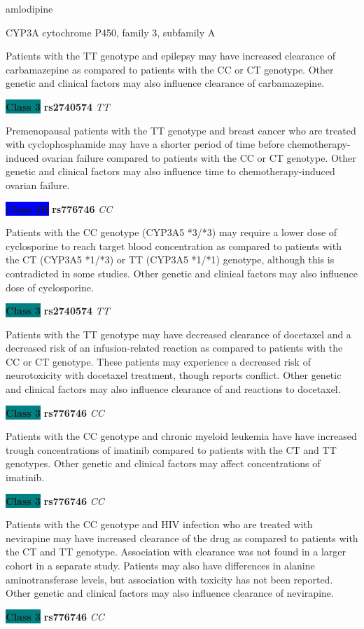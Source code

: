 \documentclass{resume} %
\begin{document}
\begin{rSection}{ amlodipine }
\begin{rSubsection}{ CYP3A }{ cytochrome P450, family 3, subfamily A }{}{}
\item[] Patients with the TT genotype and epilepsy may have increased clearance of carbamazepine as compared to patients with the CC or CT genotype. Other genetic and clinical factors may also influence clearance of carbamazepine.\item \textbf{\colorbox{teal} {Class 3}} \textbf{ rs2740574 } \textit{ TT }
\item[] Premenopausal patients with the TT genotype and breast cancer who are treated with cyclophosphamide may have a shorter period of time before chemotherapy-induced ovarian failure compared to patients with the CC or CT genotype. Other genetic and clinical factors may also influence time to chemotherapy-induced ovarian failure.\item \textbf{\colorbox{blue} {Class 2B}} \textbf{ rs776746 } \textit{ CC }
\item[] Patients with the CC genotype (CYP3A5 *3/*3) may require a lower dose of cyclosporine to reach target blood concentration as compared to patients with the CT (CYP3A5 *1/*3) or TT (CYP3A5 *1/*1) genotype, although this is contradicted in some studies. Other genetic and clinical factors may also influence dose of cyclosporine.\item \textbf{\colorbox{teal} {Class 3}} \textbf{ rs2740574 } \textit{ TT }
\item[] Patients with the TT genotype may have decreased clearance of docetaxel and a decreased risk of an infusion-related reaction as compared to patients with the CC or CT genotype. These patients may experience a decreased risk of neurotoxicity with docetaxel treatment, though reports conflict. Other genetic and clinical factors may also influence clearance of and reactions to docetaxel.\item \textbf{\colorbox{teal} {Class 3}} \textbf{ rs776746 } \textit{ CC }
\item[] Patients with the CC genotype and chronic myeloid leukemia have have increased trough concentrations of imatinib compared to patients with the CT and TT genotypes. Other genetic and clinical factors may affect concentrations of imatinib.\item \textbf{\colorbox{teal} {Class 3}} \textbf{ rs776746 } \textit{ CC }
\item[] Patients with the CC genotype and HIV infection who are treated with nevirapine may have increased clearance of the drug as compared to patients with the CT and TT genotype. Association with clearance was not found in a larger cohort in a separate study. Patients may also have differences in alanine aminotransferase levels, but association with toxicity has not been reported. Other genetic and clinical factors may also influence clearance of nevirapine.\item \textbf{\colorbox{teal} {Class 3}} \textbf{ rs776746 } \textit{ CC }

\end{rSubsection}
\end{rSection}
\end{document}
